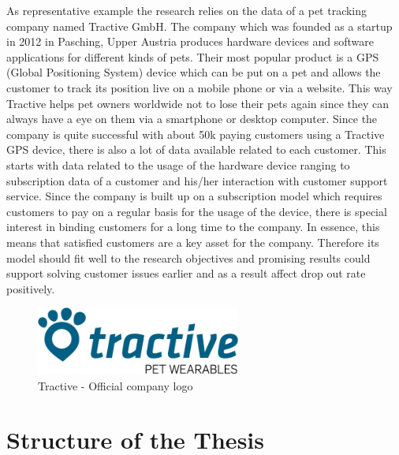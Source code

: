 As representative example the research relies on the data of a pet tracking company named Tractive GmbH. The company which was founded as a startup in 2012 in Pasching, Upper Austria produces hardware devices and software applications for different kinds of pets. Their most popular product is a GPS (Global Positioning System) device which can be put on a pet and allows the customer to track its position live on a mobile phone or via a website. This way Tractive helps pet owners worldwide not to lose their pets again since they can always have a eye on them via a smartphone or desktop computer. Since the company is quite successful with about 50k paying customers using a Tractive GPS device, there is also a lot of data available related to each customer. This starts with data related to the usage of the hardware device ranging to subscription data of a customer and his/her interaction with customer support service. Since the company is built up on a subscription model which requires customers to pay on a regular basis for the usage of the device, there is special interest in binding customers for a long time to the company. In essence, this means that satisfied customers are a key asset for the company. Therefore its model should fit well to the research objectives and promising results could support solving customer issues earlier and as a result affect drop out rate positively. 

\begin{figure}[H]
	\centering
		\includegraphics[width=0.6\textwidth]{img/tractiveLogo.jpg}%
	\caption{Tractive - Official company logo}	
\end{figure}

\section{Structure of the Thesis}

